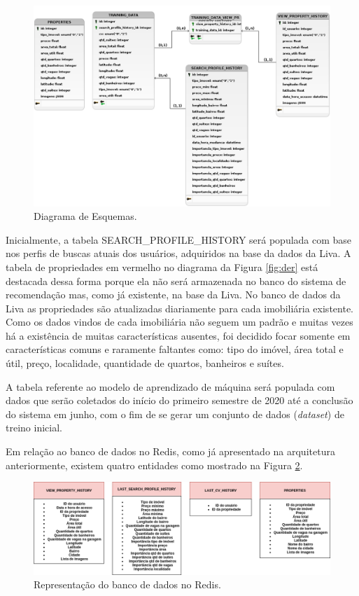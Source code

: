 \begin{figure}[H]
    \centering
    \includegraphics[scale=0.40]{figuras/proposta/diagrama_esquema.png}
    \caption[Diagrama de Esquemas]{Diagrama de Esquemas.}
    \label{fig:diagrama_esquema}
\end{figure}

Inicialmente, a tabela SEARCH\_PROFILE\_HISTORY será populada com base nos perfis de buscas atuais dos usuários, adquiridos na base da dados da Liva. A tabela de propriedades em vermelho no diagrama da Figura \ref{fig:der} está destacada dessa forma porque ela não será armazenada no banco do sistema de recomendação mas, como já existente, na base da Liva. No banco de dados da Liva as propriedades são atualizadas diariamente para cada imobiliária existente. Como os dados vindos de cada imobiliária não seguem um padrão e muitas vezes há a existência de muitas características ausentes, foi decidido focar somente em características comuns e raramente faltantes como: tipo do imóvel, área total e útil, preço, localidade, quantidade de quartos, banheiros e suítes.

A tabela referente ao modelo de aprendizado de máquina será populada com dados que serão coletados do início do primeiro semestre de 2020 até a conclusão do sistema em junho, com o fim de se gerar um conjunto de dados (\textit{dataset}) de treino inicial.

Em relação ao banco de dados no Redis, como já apresentado na arquitetura anteriormente, existem quatro entidades como mostrado na Figura \ref{fig:redis}.

\begin{figure}[H]
    \centering
    \includegraphics[scale=0.4]{figuras/proposta/redis.png}
    \caption[Representação do banco de dados no Redis]{Representação do banco de dados no Redis.}
    \label{fig:redis}
\end{figure}

